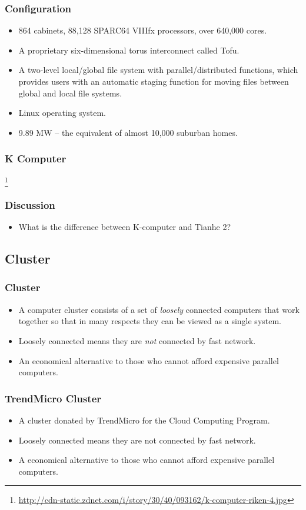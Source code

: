 \documentclass{beamer}
\begin{document}
\begin{CJK}{UTF8}{bsmi}
\begin{frame}
\frametitle{Configuration}
\begin{itemize}
\item 864 cabinets, 88,128 SPARC64 VIIIfx processors, over 640,000 cores.
\item A proprietary six-dimensional torus interconnect called Tofu.
\item A two-level local/global file system with parallel/distributed
  functions, which provides users with an automatic staging function for
  moving files between global and local file systems.
\item Linux operating system.
\item 9.89 MW -- the equivalent of almost 10,000 suburban homes.
\end{itemize}
\end{frame}

\begin{frame}
\frametitle{K Computer}
\centerline{}
\footnote{\url{http://cdn-static.zdnet.com/i/story/30/40/093162/k-computer-riken-4.jpg}}
\end{frame}

\begin{frame}
\frametitle{Discussion}
\begin{itemize}
\item What is the difference between K-computer and Tianhe 2?
\end{itemize}
\end{frame}


\subsection{Cluster}

\begin{frame}
\frametitle{Cluster}
\begin{itemize}
\item A computer cluster consists of a set of {\em loosely} connected
  computers that work together so that in many respects they can be
  viewed as a single system.
\item Loosely connected means they are {\em not} connected by fast
  network.
\item An economical alternative to those who cannot afford expensive
  parallel computers.
\end{itemize}
\end{frame}

\begin{frame}
\frametitle{TrendMicro Cluster}
\begin{itemize}
\item A cluster donated by TrendMicro for the Cloud Computing Program.
\item Loosely connected means they are not connected by fast network.
\item A economical alternative to those who cannot afford expensive
  parallel computers.
\end{itemize}
\end{frame}


\end{CJK}
\end{document}
